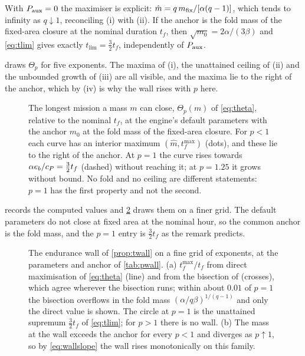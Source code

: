 \begin{remark}
With $P_{\mathrm{aux}}=0$ the maximiser is explicit: $\hat m = q\,m_{\mathrm{fix}}/[\alpha(q-1)]$,
which tends to infinity as $q\downarrow1$, reconciling (i) with (ii). If the
anchor is the fold mass of the fixed-area closure at the nominal duration $t_f$,
then $\sqrt{m_0} = 2\alpha/(3\beta)$ and \cref{eq:tlim} gives exactly
$t_{\lim} = \tfrac32 t_f$, independently of $P_{\mathrm{aux}}$.
\end{remark}

 draws $\Theta_p$ for five exponents. The maxima of (i), the
unattained ceiling of (ii) and the unbounded growth of (iii) are all visible,
and the maxima lie to the right of the anchor, which by (iv) is why the wall
rises with $p$ here.

\begin{figure}[tbp]
\centering

\caption{The longest mission a mass $m$ can close, $\Theta_p(m)$ of
\cref{eq:theta}, relative to the nominal $t_f$, at the engine's default
parameters with the anchor $m_0$ at the fold mass of the fixed-area closure.
For $p<1$ each curve has an interior maximum $(\hat m,t_f^{\max})$ (dots), and
these lie to the right of the anchor. At $p=1$ the curve rises towards
$\alpha e_b/c_P=\tfrac32t_f$ (dashed) without reaching it; at $p=1.25$ it grows
without bound. No fold and no ceiling are different statements: $p=1$ has the
first property and not the second.}
\label{fig:theta}
\end{figure}

 records the computed values and \cref{fig:pwall} draws them
on a finer grid. The default parameters do not close at fixed area at the
nominal hour, so the common anchor is the fold mass, and the $p=1$ entry is
$\tfrac32 t_f$ as the remark predicts.

\begin{figure}[tbp]
\centering

\caption{The endurance wall of \cref{prop:twall} on a fine grid of exponents,
at the parameters and anchor of \cref{tab:pwall}. (a) $t_f^{\max}/t_f$ from
direct maximisation of \cref{eq:theta} (line) and from the bisection of
 (crosses), which agree wherever the bisection
runs; within about $0.01$ of $p=1$ the bisection overflows in the fold mass
$(\alpha/q\beta)^{1/(q-1)}$ and only the direct value is shown. The circle at
$p=1$ is the unattained supremum $\tfrac32t_f$ of \cref{eq:tlim}; for $p>1$
there is no wall. (b) The mass at the wall exceeds the anchor for every $p<1$
and diverges as $p\uparrow1$, so by \cref{eq:wallslope} the wall rises
monotonically on this family.}
\label{fig:pwall}
\end{figure}

